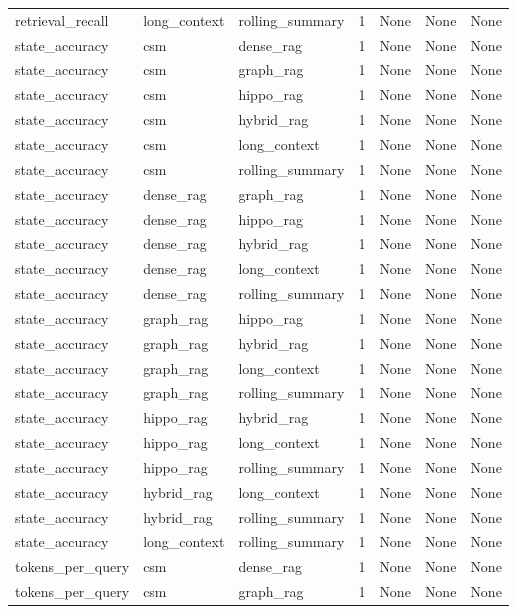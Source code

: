 \begin{tabular}{lllllll}
retrieval\_recall & long\_context & rolling\_summary & 1 & None & None & None \\
state\_accuracy & csm & dense\_rag & 1 & None & None & None \\
state\_accuracy & csm & graph\_rag & 1 & None & None & None \\
state\_accuracy & csm & hippo\_rag & 1 & None & None & None \\
state\_accuracy & csm & hybrid\_rag & 1 & None & None & None \\
state\_accuracy & csm & long\_context & 1 & None & None & None \\
state\_accuracy & csm & rolling\_summary & 1 & None & None & None \\
state\_accuracy & dense\_rag & graph\_rag & 1 & None & None & None \\
state\_accuracy & dense\_rag & hippo\_rag & 1 & None & None & None \\
state\_accuracy & dense\_rag & hybrid\_rag & 1 & None & None & None \\
state\_accuracy & dense\_rag & long\_context & 1 & None & None & None \\
state\_accuracy & dense\_rag & rolling\_summary & 1 & None & None & None \\
state\_accuracy & graph\_rag & hippo\_rag & 1 & None & None & None \\
state\_accuracy & graph\_rag & hybrid\_rag & 1 & None & None & None \\
state\_accuracy & graph\_rag & long\_context & 1 & None & None & None \\
state\_accuracy & graph\_rag & rolling\_summary & 1 & None & None & None \\
state\_accuracy & hippo\_rag & hybrid\_rag & 1 & None & None & None \\
state\_accuracy & hippo\_rag & long\_context & 1 & None & None & None \\
state\_accuracy & hippo\_rag & rolling\_summary & 1 & None & None & None \\
state\_accuracy & hybrid\_rag & long\_context & 1 & None & None & None \\
state\_accuracy & hybrid\_rag & rolling\_summary & 1 & None & None & None \\
state\_accuracy & long\_context & rolling\_summary & 1 & None & None & None \\
tokens\_per\_query & csm & dense\_rag & 1 & None & None & None \\
tokens\_per\_query & csm & graph\_rag & 1 & None & None & None \\

\end{tabular}
